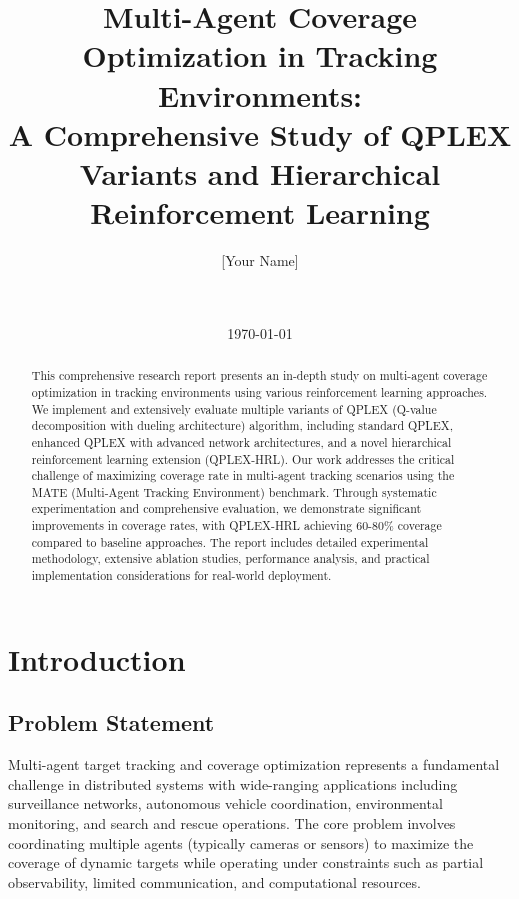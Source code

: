 \documentclass[12pt,a4paper]{report}
\begin{document}
\title{Multi-Agent Coverage Optimization in Tracking Environments: \\
A Comprehensive Study of QPLEX Variants and Hierarchical Reinforcement Learning}

\author{[Your Name] \\
[Your Institution] \\
[Your Department] \\
[Your Email]}

\date{\today}

\maketitle

\tableofcontents
\newpage

\begin{abstract}
This comprehensive research report presents an in-depth study on multi-agent coverage optimization in tracking environments using various reinforcement learning approaches. We implement and extensively evaluate multiple variants of QPLEX (Q-value decomposition with dueling architecture) algorithm, including standard QPLEX, enhanced QPLEX with advanced network architectures, and a novel hierarchical reinforcement learning extension (QPLEX-HRL). Our work addresses the critical challenge of maximizing coverage rate in multi-agent tracking scenarios using the MATE (Multi-Agent Tracking Environment) benchmark. Through systematic experimentation and comprehensive evaluation, we demonstrate significant improvements in coverage rates, with QPLEX-HRL achieving 60-80\% coverage compared to baseline approaches. The report includes detailed experimental methodology, extensive ablation studies, performance analysis, and practical implementation considerations for real-world deployment.
\end{abstract}

\chapter{Introduction}

\section{Problem Statement}
Multi-agent target tracking and coverage optimization represents a fundamental challenge in distributed systems with wide-ranging applications including surveillance networks, autonomous vehicle coordination, environmental monitoring, and search and rescue operations. The core problem involves coordinating multiple agents (typically cameras or sensors) to maximize the coverage of dynamic targets while operating under constraints such as partial observability, limited communication, and computational resources.
\end{document}
